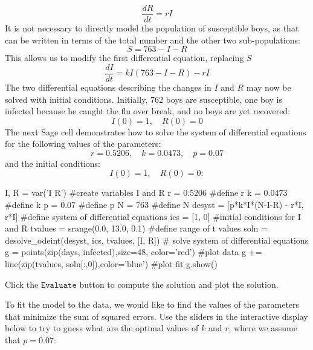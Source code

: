 \documentclass{ximera}
\begin{document}
$$\frac{dR}{dt}=rI $$
It is not necessary to directly model the population of susceptible boys, as that can be written in terms of the total number and the other two sub-populations:
$$S=763-I-R$$
This allows us to modify the first differential equation, replacing $S$
$$\frac{dI}{dt}=kI(763-I-R)-rI$$
The two differential equations describing the changes in $I$ and $R$ may now be solved with initial conditions.  Initially, 762 boys are susceptible, one boy is infected because he caught the flu over break, and no boys are yet recovered:
$$I(0)=1,\quad R(0)=0$$
The next Sage cell demonstrates how to solve the system of differential equations for the following values of the parameters:
\[
r = 0.5206,\quad k = 0.0473,\quad p = 0.07
\]
and the initial conditions:
\[
I(0)=1,\quad R(0)=0:
\]
 
\begin{sageCell}
I, R = var('I R')  #create variables I and R 
r = 0.5206  #define r
k = 0.0473  #define k
p = 0.07    #define p
N = 763     #define N
desyst = [p*k*I*(N-I-R) - r*I, r*I]  #define system of differential equations
ics = [1, 0]  #initial conditions for I and R
tvalues = srange(0.0, 13.0, 0.1)  #define range of t values
soln = desolve_odeint(desyst, ics, tvalues, [I, R])  # solve system of differential equations
g = points(zip(days, infected),size=48, color='red')  #plot data
g += line(zip(tvalues, soln[:,0]),color='blue')   #plot fit
g.show()\end{sageCell}
 
Click the $\mathtt{Evaluate}$ button to compute the solution and plot the solution.
 
To fit the model to the data, we would like to find the values of the parameters that minimize the sum of squared errors. Use the sliders in the interactive display below to try to guess what are the optimal values of $k$ and $r$, where we assume that $p=0.07$:
 
\end{document}

